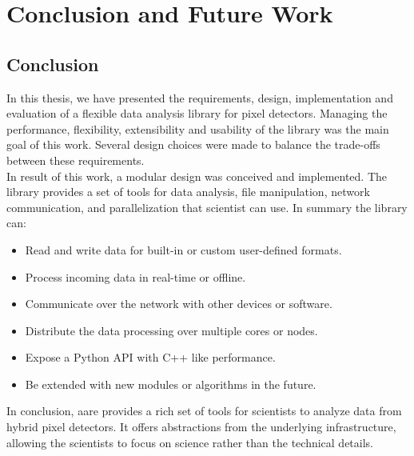 \chapter{Conclusion and Future Work}
\pagestyle{fancy}
\fancyhf{}
\fancyhead[R]{\bfseries\rightmark}
\fancyfoot[R]{\thepage}
\renewcommand{\headrulewidth}{0.5pt}
\renewcommand{\footrulewidth}{0pt}
\renewcommand{\chaptermark}[1]{\markboth{\MakeUppercase{\chaptername~\thechapter. #1 }}{}}
\renewcommand{\sectionmark}[1]{\markright{\thechapter.\thesection~ #1}}

\begin{spacing}{1.2}
\section*{Conclusion}
In this thesis, we have presented the requirements, design, implementation and evaluation 
of a flexible data analysis library for pixel detectors. Managing the performance, 
flexibility, extensibility and usability of the library was the main goal of this work.
Several design choices were made to balance the trade-offs between these requirements.\\

In result of this work, a modular design was conceived and implemented. The library 
provides a set of tools for data analysis, file manipulation, network communication,
and parallelization that scientist can use. In summary the library can:

\begin{itemize}
    \item Read and write data for built-in or custom user-defined formats. 
    \item Process incoming data in real-time or offline.
    \item Communicate over the network with other devices or software.
    \item Distribute the data processing over multiple cores or nodes.
    \item Expose a Python API with C++ like performance.
    \item Be extended with new modules or algorithms in the future.
\end{itemize}

In conclusion, aare provides a rich set of tools for scientists to analyze data from
hybrid pixel detectors. It offers abstractions from the underlying infrastructure, 
allowing the scientists to focus on science rather than the technical details.\\



\end{spacing}
